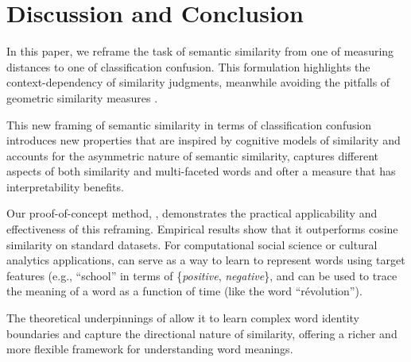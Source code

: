 \section{Discussion and Conclusion}


In this paper, we reframe the task of semantic similarity from one of measuring distances to one of classification confusion. This formulation highlights the context-dependency of similarity judgments, meanwhile avoiding the pitfalls of geometric similarity measures \cite{evers2014revisiting}.

This new framing of semantic similarity in terms of classification confusion introduces new properties that are inspired by cognitive models of similarity \cite{tversky1977features} and accounts for the asymmetric nature of semantic similarity, captures different aspects of both similarity and multi-faceted words and ofter a measure that has interpretability benefits. 

Our proof-of-concept method, \wc, demonstrates the practical applicability and effectiveness of this reframing. Empirical results show that it outperforms cosine similarity on standard datasets.
For computational social science or cultural analytics applications, \wc can serve as a way to learn to represent words using target features (e.g., ``school'' in terms of \{\textit{positive}, \textit{negative}\}, and can be used to trace the meaning of a word as a function of time (like the word ``r\'{e}volution'').

The theoretical underpinnings of \wc allow it to learn complex word identity boundaries and capture the directional nature of similarity, offering a richer and more flexible framework for understanding word meanings. 

